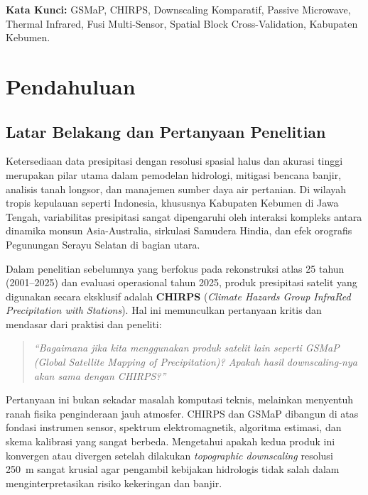 \documentclass[11pt,a4paper,titlepage]{article}
\begin{document}
\vspace{0.4cm}
\noindent \textbf{Kata Kunci:} GSMaP, CHIRPS, Downscaling Komparatif, Passive Microwave, Thermal Infrared, Fusi Multi-Sensor, Spatial Block Cross-Validation, Kabupaten Kebumen.

\newpage
\tableofcontents
\newpage
\listoffigures
\vspace{0.8cm}
\listoftables

\newpage
{}

\section{Pendahuluan}

\subsection{Latar Belakang dan Pertanyaan Penelitian}
Ketersediaan data presipitasi dengan resolusi spasial halus dan akurasi tinggi merupakan pilar utama dalam pemodelan hidrologi, mitigasi bencana banjir, analisis tanah longsor, dan manajemen sumber daya air pertanian. Di wilayah tropis kepulauan seperti Indonesia, khususnya Kabupaten Kebumen di Jawa Tengah, variabilitas presipitasi sangat dipengaruhi oleh interaksi kompleks antara dinamika monsun Asia-Australia, sirkulasi Samudera Hindia, dan efek orografis Pegunungan Serayu Selatan di bagian utara.

Dalam penelitian sebelumnya yang berfokus pada rekonstruksi atlas 25 tahun (2001--2025) dan evaluasi operasional tahun 2025, produk presipitasi satelit yang digunakan secara eksklusif adalah \textbf{CHIRPS} (\textit{Climate Hazards Group InfraRed Precipitation with Stations}). Hal ini memunculkan pertanyaan kritis dan mendasar dari praktisi dan peneliti:
\begin{quote}
\textit{``Bagaimana jika kita menggunakan produk satelit lain seperti GSMaP (Global Satellite Mapping of Precipitation)? Apakah hasil downscaling-nya akan sama dengan CHIRPS?''}
\end{quote}

Pertanyaan ini bukan sekadar masalah komputasi teknis, melainkan menyentuh ranah fisika penginderaan jauh atmosfer. CHIRPS dan GSMaP dibangun di atas fondasi instrumen sensor, spektrum elektromagnetik, algoritma estimasi, dan skema kalibrasi yang sangat berbeda. Mengetahui apakah kedua produk ini konvergen atau divergen setelah dilakukan \textit{topographic downscaling} resolusi 250~m sangat krusial agar pengambil kebijakan hidrologis tidak salah dalam menginterpretasikan risiko kekeringan dan banjir.
\end{document}
